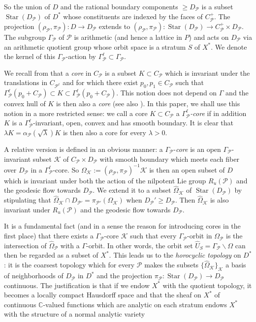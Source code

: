 \documentclass[12pt,letterpaper]{amsart}
\numberwithin{equation}{section}
\def\CC{{\mathbb C}}
\def\G{\Gamma}
\def\bs{\backslash}
\def\Kcal{{\mathcal K}}
\def\Pcal{{\mathcal P}}
\newcommand\Star{\operatorname{Star}}
\theoremstyle{remark}
\begin{document}
So the union  of $D$ and the rational boundary components  $\ge D_\Pcal$ is a subset $\Star(D_\Pcal)$ of $D^*$  whose constituents are indexed by the faces of  $C^+_\Pcal$. The projection $(\rho_\Pcal,\pi_\Pcal): D\to D_\Pcal$ extends to $(\rho_\Pcal,\pi_\Pcal): \Star(D_\Pcal)\to C^+_\Pcal\times D_\Pcal$. 
\\


The subgroup  $\G_\Pcal$ of   $\Pcal$ is arithmetic (and hence a lattice in $P$) and acts on $D_\Pcal$ 
via an arithmetic  quotient group whose  orbit space is a stratum  $S$ of $X^*$. 
We denote the kernel of this $\G_\Pcal$-action  by $\G_\Pcal^\ell\subset \G_\Pcal$.

We recall from \cite{amrt}  that a \emph{core} in $C_\Pcal$  is a 
subset  $K\subset C_\Pcal$ which is invariant under the translations in $C_{\Pcal^\ell}$ and  for which there exist $p_0, p_1\in C_\Pcal$  such that $\G_{\Pcal}^\ell (p_0+C_\Pcal)\subset K\subset 
\G_{\Pcal}^\ell (p_0+C_\Pcal)$. This notion  does not depend on $\G$  and  the convex hull of $K$ is then also a \emph{core} (see also \cite{looij:cone}).
In this paper, we shall use this notion in a more restricted sense:  we call  a core $K\subset C_\Pcal$ a \emph{$\G_\Pcal^\ell$-core} if in addition  $K$ is a  
$\G_\Pcal^\ell$-invariant, open, convex and has  smooth boundary. It is clear that $\lambda K=\alpha_\Pcal(\sqrt{\lambda})K$ is then also a core for every $\lambda >0$. 

A relative version is defined in  an obvious manner: a $\G_\Pcal$-\emph{core}  is an open $\G_\Pcal$-invariant subset $\Kcal$ of $C_\Pcal\times D_\Pcal$ with smooth boundary which meets each  fiber over $D_\Pcal$ in a $\G_\Pcal^\ell$-core.  So $\Omega_\Kcal:=(\rho_\Pcal,\pi_\Pcal)^{-1}\Kcal$ is then an open subset of $D$ which is  invariant under  both the action of the nilpotent Lie group $R_u(\Pcal)$ and the geodesic flow towards $D_\Pcal$. We extend it to a subset $\hat\Omega_\Kcal$ of $\Star(D_\Pcal)$ by stipulating that 
$\hat\Omega_\Kcal\cap D_{\Pcal'}=\pi_{\Pcal'}(\Omega_\Kcal)$ when $D_\Pcal'\ge D_\Pcal$. Then  $\hat\Omega_\Kcal$   is also invariant  under $R_u(\Pcal)$ and the geodesic flow towards  $D_\Pcal$.  

It is a fundamental  fact (and in a sense the  reason for introducing cores in the first place) that there exists  a $\G_\Pcal$-core $\Kcal$ such that every  $\G_\Pcal$-orbit in  $\Omega_\Pcal$ 
is the intersection of $\hat\Omega_\Pcal$ with a   $\G$-orbit. In other words, the orbit set $\hat U_S=\G_\Pcal\bs\Omega $ 
can then be regarded as a subset of $X^*$. This  leads us to the \emph{horocyclic topology} on $D^*$: 
it  is  the coarsest topology which  for every $\Pcal$ makes the subsets $\{\hat\Omega_\Kcal\}_\Kcal$ a basis of neighborhoods 
of $D_\Pcal$ in $D^*$ and the  projection $\pi_\Pcal: \Star(D_\Pcal)\to D_\Pcal$ continuous. The justification is that if we  endow 
$X^*$ with the quotient topology, it becomes a locally compact Hausdorff space and that the sheaf on $X^*$ of continuous 
$\CC$-valued functions which are analytic on each stratum endows $X^*$ with the structure of a normal analytic variety
\end{document}
